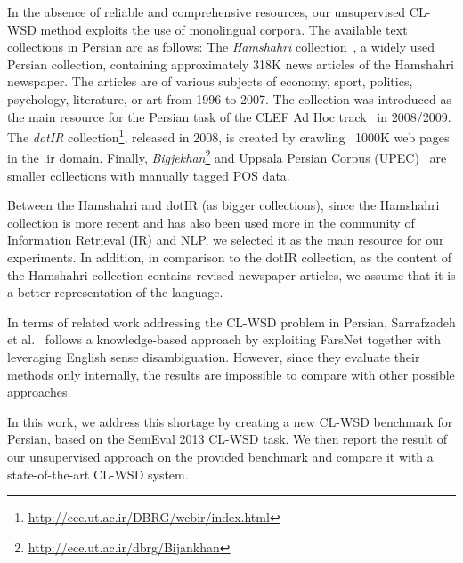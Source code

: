 In the absence of reliable and comprehensive resources, our unsupervised CL-WSD method exploits the use of monolingual corpora. The available text collections in Persian are as follows: The \emph{Hamshahri} collection~\cite{aleahmad2009hamshahri}, a widely used Persian collection, containing approximately 318K news articles of the Hamshahri newspaper. The articles are of various subjects of economy, sport, politics, psychology, literature, or art from 1996 to 2007. The collection was introduced as the main resource for the Persian task of the CLEF Ad Hoc track~\cite{ferro2010clef,agirre2009clef} in 2008/2009. The \emph{dotIR} collection\footnote{\url{http://ece.ut.ac.ir/DBRG/webir/index.html}}, released in 2008, is created by crawling ~1000K web pages in the .ir domain. Finally,  \emph{Bigjekhan}\footnote{\url{http://ece.ut.ac.ir/dbrg/Bijankhan}} and Uppsala Persian Corpus (UPEC)~\cite{seraji2012} are smaller collections with manually tagged POS data. 

Between the Hamshahri and dotIR (as bigger collections), since the Hamshahri collection is more recent and  has also been used more in the community of Information Retrieval (IR) and NLP, we selected it as the main resource for our experiments. In addition, in comparison to the dotIR collection, as the content of the Hamshahri collection contains revised newspaper articles, we assume that it is a better representation of the language. 


In terms of related work addressing the CL-WSD problem in Persian, Sarrafzadeh et al.~\cite{sarrafzadeh2011} follows a knowledge-based approach by exploiting FarsNet together with leveraging English sense disambiguation. %
However, since they evaluate their methods only internally, the results are impossible to compare with other possible approaches. %

In this work, we address this shortage by creating a new CL-WSD benchmark  for Persian, based on the SemEval 2013 CL-WSD task. We then report the result of our unsupervised approach on the provided benchmark and compare it with a state-of-the-art CL-WSD system.